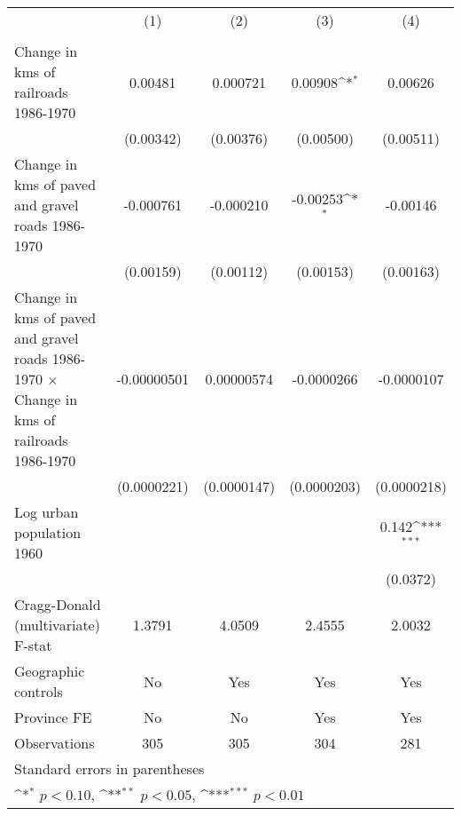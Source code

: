 {
\def\sym#1{\ifmmode^{#1}\else\(^{#1}\)\fi}
\begin{tabular}{l*{4}{c}}
\hline\hline
                &\multicolumn{1}{c}{(1)}&\multicolumn{1}{c}{(2)}&\multicolumn{1}{c}{(3)}&\multicolumn{1}{c}{(4)}\\
                &\multicolumn{1}{c}{}&\multicolumn{1}{c}{}&\multicolumn{1}{c}{}&\multicolumn{1}{c}{}\\
\hline
Change in kms of railroads 1986-1970&  0.00481         & 0.000721         &  0.00908\sym{*}  &  0.00626         \\
                &(0.00342)         &(0.00376)         &(0.00500)         &(0.00511)         \\
[1em]
Change in kms of paved and gravel roads 1986-1970&-0.000761         &-0.000210         & -0.00253\sym{*}  & -0.00146         \\
                &(0.00159)         &(0.00112)         &(0.00153)         &(0.00163)         \\
[1em]
Change in kms of paved and gravel roads 1986-1970 $\times$ Change in kms of railroads 1986-1970&-0.00000501         &0.00000574         &-0.0000266         &-0.0000107         \\
                &(0.0000221)         &(0.0000147)         &(0.0000203)         &(0.0000218)         \\
[1em]
Log urban population 1960&                  &                  &                  &    0.142\sym{***}\\
                &                  &                  &                  & (0.0372)         \\
\hline
Cragg-Donald (multivariate) F-stat&   1.3791         &   4.0509         &   2.4555         &   2.0032         \\
Geographic controls&       No         &      Yes         &      Yes         &      Yes         \\
Province FE     &       No         &       No         &      Yes         &      Yes         \\
Observations    &      305         &      305         &      304         &      281         \\
\hline\hline
\multicolumn{5}{l}{\footnotesize Standard errors in parentheses}\\
\multicolumn{5}{l}{\footnotesize \sym{*} \(p<0.10\), \sym{**} \(p<0.05\), \sym{***} \(p<0.01\)}\\
\end{tabular}
}
